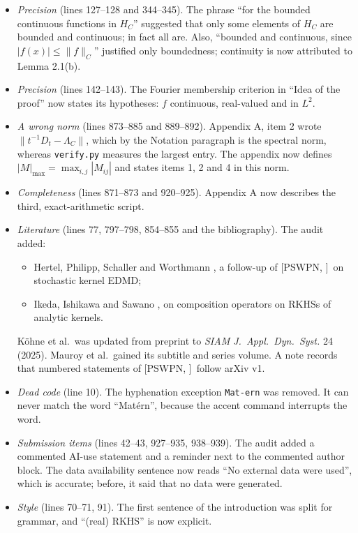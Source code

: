 \documentclass[11pt]{amsart}
\newcommand{\file}[1]{\texttt{#1}}
\newcommand{\PS}[1][]{[PSWPN\ifx\relax#1\relax\else, #1\fi]}
\begin{document}
\begin{itemize}
\item[C8] \emph{Precision} (lines 127--128 and 344--345). The phrase ``for the bounded continuous functions in $H_C$''
suggested that only some elements of $H_C$ are bounded and continuous; in fact all are. Also, ``bounded and
continuous, since $|f(x)|\le\|f\|_C$'' justified only boundedness; continuity is now attributed to Lemma 2.1(b).
\item[C9] \emph{Precision} (lines 142--143). The Fourier membership criterion in ``Idea of the proof'' now states its
hypotheses: $f$ continuous, real-valued and in $L^2$.
\item[C10] \emph{A wrong norm} (lines 873--885 and 889--892). Appendix A, item 2 wrote $\|t^{-1}D_t-\Lambda_C\|$, which
by the Notation paragraph is the spectral norm, whereas \file{verify.py} measures the largest entry. The appendix now
defines $|M|_{\max}=\max_{i,j}|M_{ij}|$ and states items 1, 2 and 4 in this norm.
\item[C11] \emph{Completeness} (lines 871--873 and 920--925). Appendix A now describes the third, exact-arithmetic
script.
\item[C12] \emph{Literature} (lines 77, 797--798, 854--855 and the bibliography). The audit added:
\begin{itemize}
\item Hertel, Philipp, Schaller and Worthmann \cite{Hertel}, a follow-up of \PS\ on stochastic kernel EDMD;
\item Ikeda, Ishikawa and Sawano \cite{IIS}, on composition operators on RKHSs of analytic kernels.
\end{itemize}
Köhne et al.\ was updated from preprint to \emph{SIAM J.\ Appl.\ Dyn.\ Syst.} 24 (2025). Mauroy et al.\ gained its
subtitle and series volume. A note records that numbered statements of \PS\ follow arXiv v1.
\item[C13] \emph{Dead code} (line 10). The hyphenation exception \texttt{Mat-ern} was removed. It can never match the
word ``Mat\'ern'', because the accent command interrupts the word.
\item[C14] \emph{Submission items} (lines 42--43, 927--935, 938--939). The audit added a commented AI-use statement
and a reminder next to the commented author block. The data availability sentence now reads ``No external data were
used'', which is accurate; before, it said that no data were generated.
\item[C15] \emph{Style} (lines 70--71, 91). The first sentence of the introduction was split for grammar, and ``(real)
RKHS'' is now explicit.
\end{itemize}
\end{document}
